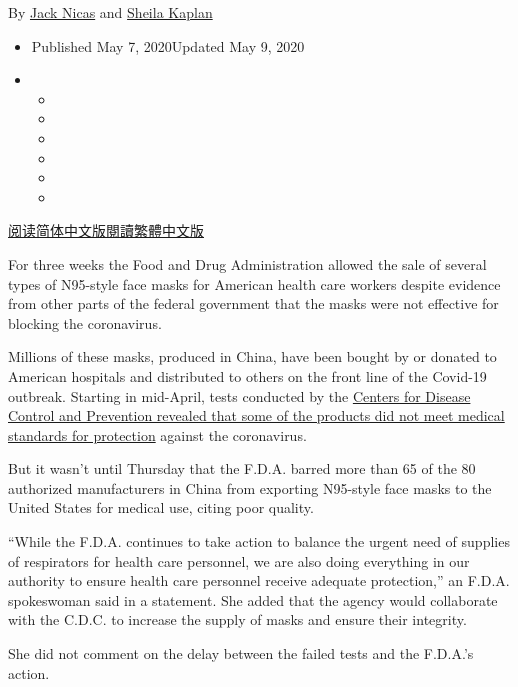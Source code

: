 By \href{https://www.nytimes3xbfgragh.onion/by/jack-nicas}{Jack Nicas}
and \href{https://www.nytimes3xbfgragh.onion/by/sheila-kaplan}{Sheila
Kaplan}

\begin{itemize}
\item
  Published May 7, 2020Updated May 9, 2020
\item
  \begin{itemize}
  \item
  \item
  \item
  \item
  \item
  \item
  \end{itemize}
\end{itemize}

\href{https://cn.nytimes3xbfgragh.onion/usa/20200508/masks-banned-n95-coronavirus/}{阅读简体中文版}\href{https://cn.nytimes3xbfgragh.onion/usa/20200508/masks-banned-n95-coronavirus/zh-hant/}{閱讀繁體中文版}

For three weeks the Food and Drug Administration allowed the sale of
several types of N95-style face masks for American health care workers
despite evidence from other parts of the federal government that the
masks were not effective for blocking the coronavirus.

Millions of these masks, produced in China, have been bought by or
donated to American hospitals and distributed to others on the front
line of the Covid-19 outbreak. Starting in mid-April, tests conducted by
the
\href{https://www.cdc.gov/niosh/npptl/respirators/testing/NonNIOSHresults.html}{Centers
for Disease Control and Prevention revealed that some of the products
did not meet medical standards for protection} against the coronavirus.

But it wasn't until Thursday that the F.D.A. barred more than 65 of the
80 authorized manufacturers in China from exporting N95-style face masks
to the United States for medical use, citing poor quality.

``While the F.D.A. continues to take action to balance the urgent need
of supplies of respirators for health care personnel, we are also doing
everything in our authority to ensure health care personnel receive
adequate protection,'' an F.D.A. spokeswoman said in a statement. She
added that the agency would collaborate with the C.D.C. to increase the
supply of masks and ensure their integrity.

She did not comment on the delay between the failed tests and the
F.D.A.'s action.


